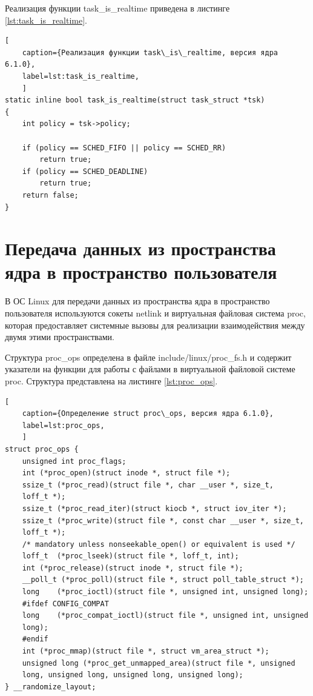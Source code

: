 Реализация функции task\_is\_realtime приведена в листинге \ref{lst:task_is_realtime}. \cite{rt}

\begin{lstlisting}[
	caption={Реализация функции task\_is\_realtime, версия ядра 6.1.0},
	label=lst:task_is_realtime,
	]
static inline bool task_is_realtime(struct task_struct *tsk)
{
	int policy = tsk->policy;
	
	if (policy == SCHED_FIFO || policy == SCHED_RR)
		return true;
	if (policy == SCHED_DEADLINE)
		return true;
	return false;
}
\end{lstlisting}





\section{Передача данных из пространства ядра в пространство пользователя}

В ОС Linux для передачи данных из пространства ядра в пространство пользователя используются сокеты netlink и виртуальная файловая система proc, которая предоставляет системные вызовы для реализации взаимодействия между двумя этими пространствами.

Структура proc\_ops определена в файле include/linux/proc\_fs.h и содержит указатели на функции для работы с файлами в виртуальной файловой системе proc. Структура представлена на листинге \ref{lst:proc_ops}. \cite{proc_ops}

\begin{lstlisting}[
	caption={Определение struct proc\_ops, версия ядра 6.1.0},
	label=lst:proc_ops,
	]
struct proc_ops {
	unsigned int proc_flags;
	int	(*proc_open)(struct inode *, struct file *);
	ssize_t	(*proc_read)(struct file *, char __user *, size_t, 
	loff_t *);
	ssize_t (*proc_read_iter)(struct kiocb *, struct iov_iter *);
	ssize_t	(*proc_write)(struct file *, const char __user *, size_t, 
	loff_t *);
	/* mandatory unless nonseekable_open() or equivalent is used */
	loff_t	(*proc_lseek)(struct file *, loff_t, int);
	int	(*proc_release)(struct inode *, struct file *);
	__poll_t (*proc_poll)(struct file *, struct poll_table_struct *);
	long	(*proc_ioctl)(struct file *, unsigned int, unsigned long);
	#ifdef CONFIG_COMPAT
	long	(*proc_compat_ioctl)(struct file *, unsigned int, unsigned 
	long);
	#endif
	int	(*proc_mmap)(struct file *, struct vm_area_struct *);
	unsigned long (*proc_get_unmapped_area)(struct file *, unsigned 
	long, unsigned long, unsigned long, unsigned long);
} __randomize_layout;
\end{lstlisting}

